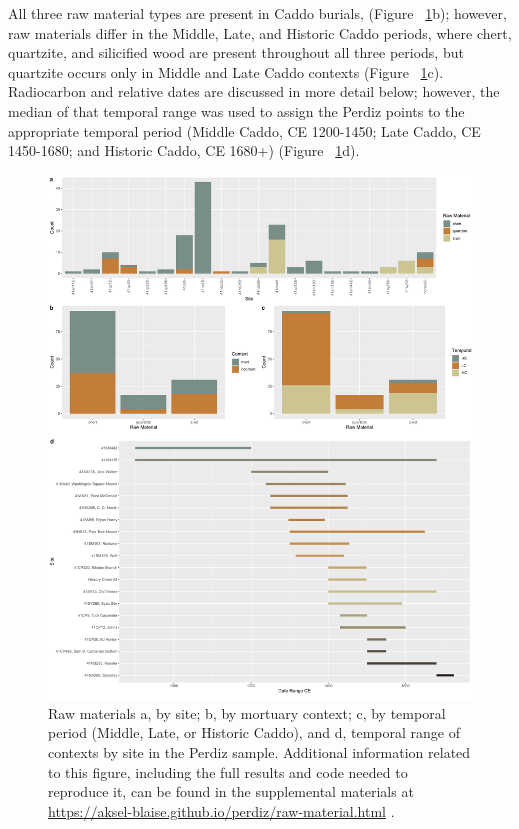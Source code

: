 \documentclass[review]{elsarticle}
\begin{document}
All three raw material types are present in Caddo burials, (Figure ~\ref{fig:raw.mat}b); however, raw materials differ in the Middle, Late, and Historic Caddo periods, where chert, quartzite, and silicified wood are present throughout all three periods, but quartzite occurs only in Middle and Late Caddo contexts (Figure ~\ref{fig:raw.mat}c). Radiocarbon and relative dates are discussed in more detail below; however, the median of that temporal range was used to assign the Perdiz points to the appropriate temporal period (Middle Caddo, CE 1200-1450; Late Caddo, CE 1450-1680; and Historic Caddo, CE 1680+) (Figure ~\ref{fig:raw.mat}d).

\begin{figure}[!]\centering
\includegraphics[width=\linewidth]{fig.mat.temp.pdf}
\caption{Raw materials a, by site; b, by mortuary context; c, by temporal period (Middle, Late, or Historic Caddo), and d, temporal range of contexts by site in the Perdiz sample. Additional information related to this figure, including the full results and code needed to reproduce it, can be found in the supplemental materials at \href{https://aksel-blaise.github.io/perdiz/raw-material.html}{https://aksel-blaise.github.io/perdiz/raw-material.html} \citep{RN8980}.}
\label{fig:raw.mat}
\end{figure}
\end{document}
